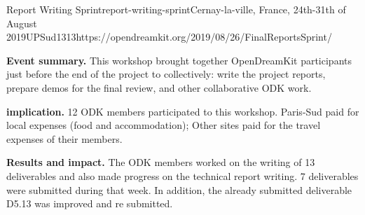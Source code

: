 \begin{event}{Report Writing Sprint}{report-writing-sprint}{Cernay-la-ville, France, 24th-31th of August 2019}{UPSud}{13}{13}{https://opendreamkit.org/2019/08/26/FinalReportsSprint/}

  \textbf{Event summary.} This workshop brought together OpenDreamKit
  participants just before the end of the project to collectively:
  write the project reports, prepare demos for the final review, and
  other collaborative ODK work.

  \textbf{\ODK implication.} 12 ODK members participated to this
  workshop. Paris-Sud paid for local expenses (food and
  accommodation); Other sites paid for the travel expenses of their
  members.

  \textbf{Results and impact.} The ODK members worked on the writing
  of 13 deliverables and also made progress on the technical report
  writing. 7 deliverables were submitted during that week. In
  addition, the already submitted deliverable D5.13 was improved and
  re submitted.
\end{event}
